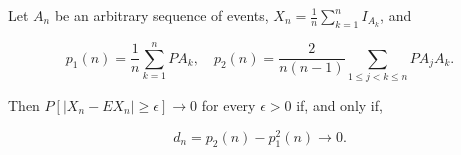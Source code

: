 Let $A_n$ be an arbitrary sequence of events, $X_n = \frac{1}{n}\sum_{k=1}^{n} I_{A_k}$, and

$$p_1(n) = \frac{1}{n}\sum_{k=1}^{n} PA_k, \quad p_2(n) = \frac{2}{n(n-1)}\sum_{1 \leq j < k \leq n} PA_j A_k.$$

Then $P[|X_n - EX_n| \geq \epsilon] \to 0$ for every $\epsilon > 0$ if, and only if,

$$d_n = p_2(n) - p_1^2(n) \to 0.$$
